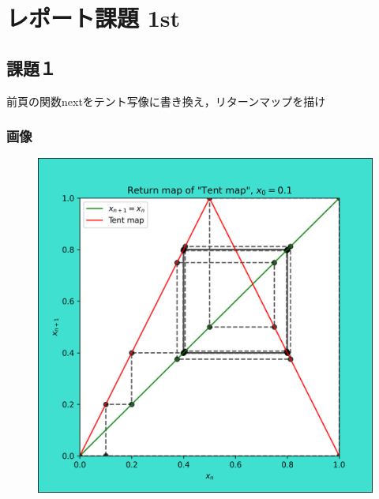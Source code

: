 \section{レポート課題 1st}

\subsection{課題１}
前頁の関数nextをテント写像に書き換え，リターンマップを描け\\
\subsubsection{画像}
\begin{figure}[htbp]
  \centering
  \includegraphics[keepaspectratio, scale=0.7]{images/Problem6/task6.png}
\end{figure}

